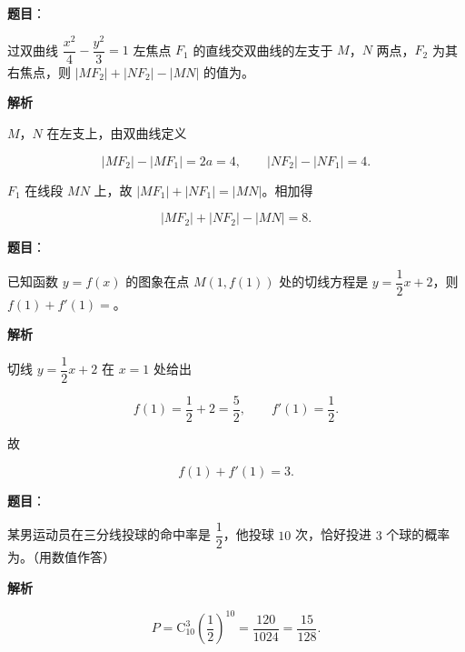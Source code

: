 \begin{answer}

\textbf{题目}：

过双曲线 $\dfrac{x^2}{4}-\dfrac{y^2}{3}=1$ 左焦点 $F_1$ 的直线交双曲线的左支于 $M$，$N$ 两点，$F_2$ 为其右焦点，则 $|MF_2|+|NF_2|-|MN|$ 的值为\gkblank{}。

\textbf{解析}

$M$，$N$ 在左支上，由双曲线定义

\nopagebreak[4]
\[|MF_2|-|MF_1|=2a=4,\qquad |NF_2|-|NF_1|=4.\]

$F_1$ 在线段 $MN$ 上，故 $|MF_1|+|NF_1|=|MN|$。相加得

\nopagebreak[4]
\[|MF_2|+|NF_2|-|MN|=8.\]


\end{answer}
\begin{answer}

\textbf{题目}：

已知函数 $y=f(x)$ 的图象在点 $M(1,f(1))$ 处的切线方程是 $y=\dfrac12x+2$，则 $f(1)+f'(1)=$\gkblank{}。

\textbf{解析}

切线 $y=\dfrac12x+2$ 在 $x=1$ 处给出

\nopagebreak[4]
\[f(1)=\frac12+2=\frac52,\qquad f'(1)=\frac12.\]

故

\nopagebreak[4]
\[f(1)+f'(1)=3.\]


\end{answer}
\begin{answer}

\textbf{题目}：

某男运动员在三分线投球的命中率是 $\dfrac12$，他投球 $10$ 次，恰好投进 $3$ 个球的概率为\gkblank{}。（用数值作答）

\textbf{解析}

\nopagebreak[4]
\[P=\mathrm C_{10}^3\left(\frac12\right)^{10}=\frac{120}{1024}=\frac{15}{128}.\]


\end{answer}
